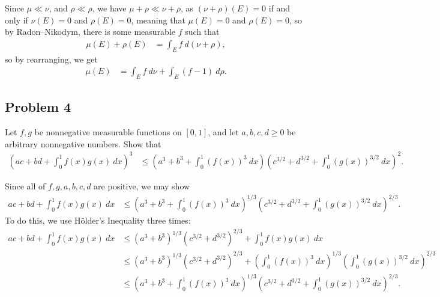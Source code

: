 \documentclass[10pt]{mypackage}
\begin{document}
Since $\mu\ll\nu$, and $\rho\ll\rho$, we have $\mu + \rho \ll \nu + \rho$, as $\left( \nu + \rho \right)(E) = 0$ if and only if $\nu(E) = 0$ and $\rho(E) = 0$, meaning that $\mu(E) = 0$ and $\rho(E) = 0$, so by Radon--Nikodym, there is some measurable $f$ such that
\begin{align*}
  \mu\left( E \right) + \rho\left( E \right) &= \int_{E}^{} f\:d\left( \nu + \rho \right),
\end{align*}
so by rearranging, we get
\begin{align*}
  \mu\left( E \right) &= \int_{E}^{} f\:d\nu + \int_{E}^{} \left( f-1 \right)\:d\rho.
\end{align*}
\subsection{Problem 4}%
\begin{problem}
  Let $f,g$ be nonnegative measurable functions on $[0,1]$, and let $a,b,c,d\geq 0$ be arbitrary nonnegative numbers. Show that
  \begin{align*}
    \left( ac + bd + \int_{0}^{1} f(x)g(x)\:dx \right)^3 &\leq \left( a^3 + b^3 + \int_{0}^{1} \left( f(x) \right)^3\:dx \right)\left( c^{3/2} + d^{3/2} + \int_{0}^{1} \left( g(x) \right)^{3/2}\:dx \right)^2.
  \end{align*}
\end{problem}
Since all of $f,g,a,b,c,d$ are positive, we may show
\begin{align*}
  ac + bd + \int_{0}^{1} f(x)g(x)\:dx &\leq \left( a^3 + b^3 + \int_{0}^{1} \left( f(x) \right)^3\:dx \right)^{1/3}\left( c^{3/2} + d^{3/2} + \int_{0}^{1} \left( g(x) \right)^{3/2}\:dx \right)^{2/3}.
\end{align*}
To do this, we use Hölder's Inequality three times:
\begin{align*}
  ac + bd + \int_{0}^{1} f(x)g(x)\:dx &\leq \left( a^3 + b^3 \right)^{1/3}\left( c^{3/2} + d^{3/2} \right)^{2/3} + \int_{0}^{1} f(x)g(x)\:dx\\
                                      &\leq \left( a^3 + b^3 \right)^{1/3}\left( c^{3/2} + d^{3/2} \right)^{2/3} + \left( \int_{0}^{1} \left( f(x) \right)^{3}\:dx \right)^{1/3}\left( \int_{0}^{1} \left( g(x) \right)^{3/2}\:dx \right)^{2/3}\\
                                      &\leq \left( a^3 + b^3 + \int_{0}^{1} \left( f(x) \right)^{3}\:dx \right)^{1/3}\left( c^{3/2} + d^{3/2} + \int_{0}^{1} \left( g(x) \right)^{3/2}\:dx \right)^{2/3}.
\end{align*}
\end{document}
